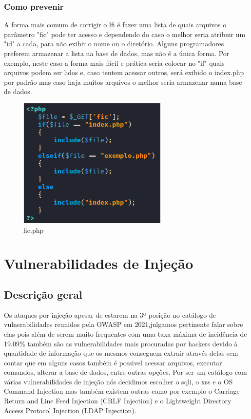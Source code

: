 \documentclass{report}
\begin{document}
	\subsection{Como prevenir}

A forma mais comum de corrigir o \ac{lfi} é fazer uma lista de quais arquivos o parâmetro "fic" pode ter acesso e dependendo do caso o melhor seria atribuir um "id" a cada, para não exibir o nome ou o diretório. Alguns programadores preferem armazenar a lista na base de dados, mas não é a única forma. Por exemplo, neste caso a forma mais fácil e prática seria colocar no "if"  quais arquivos podem ser lidos e, caso tentem acessar outros, será exibido o index.php por padrão mas caso haja muitos arquivos o melhor seria armazenar numa base de dados.

 \begin{figure}[h]
 \centering
 \includegraphics[scale=0.5]{imagescodebac/baccode6.png}
 \caption{fic.php}\label{fig:fic.php}
\end{figure}  


\chapter{Vulnerabilidades de Injeção}
\clearpage
\label{chap.injection}

\section{Descrição geral}

Os ataques por injeção apesar de estarem na 3ª posição no catálogo de vulnerabilidades reunidos pela OWASP em 2021,julgamos pertinente falar sobre elas pois além de serem muito frequentes com uma taxa máxima de incidência de 19.09\% também são as vulnerabilidades mais procuradas por hackers devido à quantidade de informação que os mesmos conseguem extrair através delas sem contar que em alguns casos também é possivel acessar arquivos, executar comandos, alterar a base de dados, entre outras opções. Por ser um catálogo com várias vulnerabilidades de injeção nós decidimos escolher o \ac{sqli}, o \ac{xss} e o OS Command Injection mas também existem outras como por exemplo o Carriage Return and Line Feed Injection (CRLF Injection) e o Lightweight Directory Access Protocol Injection (LDAP Injection).
\end{document}
